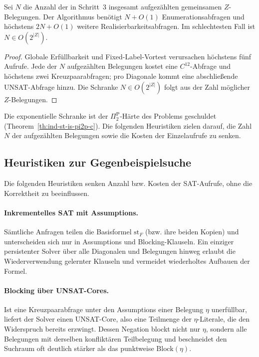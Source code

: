 \begin{Corollary}
    \label{cor:singl-aufrufe}
    Sei \(N\) die Anzahl der in Schritt~3 insgesamt aufgezählten gemeinsamen
    \(Z\)-Belegungen. Der Algorithmus benötigt \(N+O(1)\) Enumerationsabfragen
    und höchstens \(2N+O(1)\) weitere Realisierbarkeitsabfragen. Im
    schlechtesten Fall ist \(N\in O(2^{|Z|})\).
\end{Corollary}

\begin{proof}
    \label{pr:singl-aufrufe}
    Globale Erfüllbarkeit und Fixed-Label-Vortest verursachen höchstens fünf
    Aufrufe. Jede der \(N\) aufgezählten Belegungen kostet eine
    \(C^{12}\)-Abfrage und höchstens zwei Kreuzpaarabfragen; pro Diagonale
    kommt eine abschließende UNSAT-Abfrage hinzu. Die Schranke
    \(N\in O(2^{|Z|})\) folgt aus der Zahl möglicher \(Z\)-Belegungen.
\end{proof}

Die exponentielle Schranke ist der \(\Pi_2^{\mathrm P}\)-Härte des Problems
geschuldet (Theorem~\ref{th:ind-st-is-pi2p-c}). Die folgenden Heuristiken
zielen darauf, die Zahl \(N\) der aufgezählten Belegungen sowie die Kosten der
Einzelaufrufe zu senken.

\subsection{Heuristiken zur Gegenbeispielsuche}
\label{subsec:singl-heuristiken}

Die folgenden Heuristiken senken Anzahl bzw. Kosten der SAT-Aufrufe, ohne die
Korrektheit zu beeinflussen.

\paragraph{Inkrementelles SAT mit Assumptions.}
Sämtliche Anfragen teilen die Basisformel \(\mathrm{st}_F\) (bzw. ihre beiden
Kopien) und unterscheiden sich nur in Assumptions und Blocking-Klauseln. Ein
einziger persistenter Solver über alle Diagonalen und Belegungen hinweg
erlaubt die Wiederverwendung gelernter Klauseln und vermeidet wiederholtes
Aufbauen der Formel.

\paragraph{Blocking über UNSAT-Cores.}
Ist eine Kreuzpaarabfrage unter den Assumptions einer Belegung \(\eta\)
unerfüllbar, liefert der Solver einen UNSAT-Core, also eine Teilmenge der
\(\eta\)-Literale, die den Widerspruch bereits erzwingt. Dessen Negation
blockt nicht nur \(\eta\), sondern alle Belegungen mit derselben
konfliktären Teilbelegung und beschneidet den Suchraum oft deutlich stärker
als das punktweise \(\mathrm{Block}(\eta)\).

